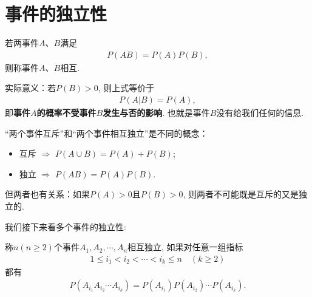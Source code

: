 \section{事件的独立性}

\begin{definition}
    若两事件$A$、$B$满足
    \begin{align*}
        P(AB)= P(A) P(B),
    \end{align*}
    则称事件$A$、$B$相互. %
\end{definition}

实际意义：若$P(B)>0$, 则上式等价于
\begin{align*}
    P(A|B)= P(A),
\end{align*}
即\textbf{事件$A$的概率不受事件$B$发生与否的影响}.  也就是事件$B$没有给我们任何的信息.

\begin{remark}
    ``两个事件互斥''和``两个事件相互独立''是不同的概念：
    \begin{itemize}
        \item 互斥 $\Rightarrow$ $P(A\cup B)=P(A)+P(B)$; 
        \item 独立 $\Rightarrow$ $P(AB)=P(A)P(B)$. 
    \end{itemize}
    但两者也有关系：如果$P(A)>0$且$P(B)>0$, 则两者不可能既是互斥的又是独立的. 
\end{remark}

我们接下来看多个事件的独立性:

\begin{definition}
    称$n(n\ge 2)$个事件$A_1, A_2, \cdots, A_n$相互独立, 如果对任意一组指标
    \begin{align*}
        1\le i_1<i_2< \cdots <i_k\le n\quad (k\ge 2)
    \end{align*}
    都有
    \begin{align*}
        P(A_{i_1}A_{i_2}\cdots A_{i_k})=P(A_{i_1})P(A_{i_2})\cdots  P(A_{i_k}).
    \end{align*}
\end{definition}

